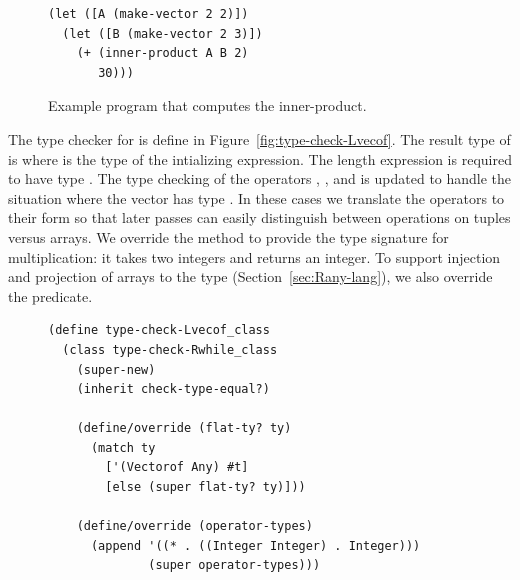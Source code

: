 \documentclass[7x10]{TimesAPriori_MIT}%
\begin{document}
{\begin{figure}[tp]
\begin{lstlisting}
(let ([A (make-vector 2 2)])
  (let ([B (make-vector 2 3)])
    (+ (inner-product A B 2)
       30)))
\end{lstlisting}
\caption{Example program that computes the inner-product.}
\label{fig:inner-product}
\end{figure}


The type checker for \LangArray{} is define in
Figure~\ref{fig:type-check-Lvecof}. The result type of
 is  where  is the type
of the intializing expression.  The length expression is required to
have type . The type checking of the operators
, , and   is
updated to handle the situation where the vector has type
. In these cases we translate the operators to their
 form so that later passes can easily distinguish
between operations on tuples versus arrays. We override the
 method to provide the type signature for
multiplication: it takes two integers and returns an integer.  To
support injection and projection of arrays to the  type
(Section~\ref{sec:Rany-lang}), we also override the 
predicate.

\begin{figure}[tbp]
\begin{lstlisting}[basicstyle=\ttfamily\footnotesize]
(define type-check-Lvecof_class
  (class type-check-Rwhile_class
    (super-new)
    (inherit check-type-equal?)

    (define/override (flat-ty? ty)
      (match ty
        ['(Vectorof Any) #t]
        [else (super flat-ty? ty)]))
    
    (define/override (operator-types)
      (append '((* . ((Integer Integer) . Integer)))
              (super operator-types)))
    

\end{lstlisting}
\end{figure}}
\end{document}
